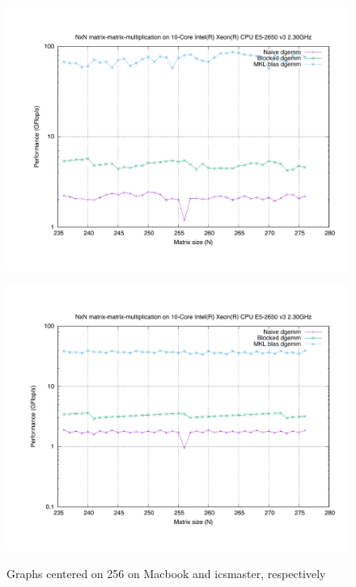 \documentclass[unicode,11pt,a4paper,oneside,numbers=endperiod,openany]{scrartcl}
\begin{document}
\begin{enumerate}
            \begin{figure}[H]
                \begin{minipage}{.5\textwidth}
                    \centering
                    \includegraphics[width=\linewidth]{./results/256_mac}
                    \label{c256_mac}
                \end{minipage}%
                \begin{minipage}{.5\textwidth}
                    \centering
                    \includegraphics[width=\linewidth]{./results/256_icsmaster} 
                    \label{c256_icsmaster}
                \end{minipage}
                \caption{Graphs centered on 256 on Macbook and icsmaster, respectively}
                \label{c256}
            \end{figure}



\end{enumerate}
\end{document}
